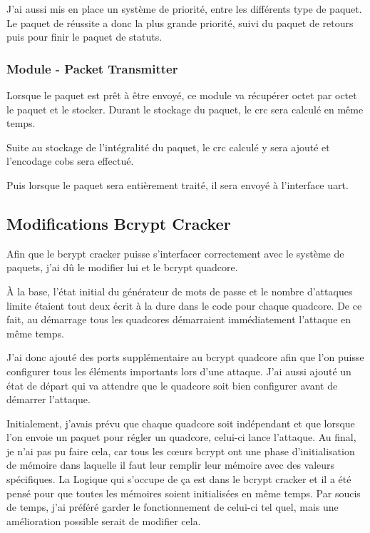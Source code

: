 J’ai aussi mis en place un système de priorité, entre les différents type de paquet. 
Le paquet de réussite a donc la plus grande priorité, suivi du paquet de retours puis pour finir le paquet de statuts.

\subsubsection{Module - Packet Transmitter}

Lorsque le paquet est prêt à être envoyé, ce module va récupérer octet par octet le paquet et le stocker.
Durant le stockage du paquet, le \gls{crc} sera calculé en même temps.

Suite au stockage de l'intégralité du paquet, le \gls{crc} calculé y sera ajouté et l'encodage \gls{cobs} sera effectué.

Puis lorsque le paquet sera entièrement traité, il sera envoyé à l'interface \gls{uart}.

\subsection{Modifications Bcrypt Cracker}

Afin que le bcrypt cracker puisse s'interfacer correctement avec le système de paquets, j'ai dû le modifier lui et le bcrypt quadcore.

À la base, l'état initial du générateur de mots de passe et le nombre d'attaques limite étaient tout deux écrit à la dure dans le code pour chaque quadcore.
De ce fait, au démarrage tous les quadcores démarraient immédiatement l'attaque en même temps.

J'ai donc ajouté des ports supplémentaire au bcrypt quadcore afin que l'on puisse configurer tous les éléments importants lors d'une attaque.
J'ai aussi ajouté un état de départ qui va attendre que le quadcore soit bien configurer avant de démarrer l'attaque.

Initialement, j'avais prévu que chaque quadcore soit indépendant et que lorsque l'on envoie un paquet pour régler un quadcore, celui-ci lance l'attaque.
Au final, je n'ai pas pu faire cela, car tous les cœurs bcrypt ont une phase d'initialisation de mémoire dans laquelle il faut leur remplir leur mémoire avec des valeurs spécifiques.
La Logique qui s'occupe de ça est dans le bcrypt cracker et il a été pensé pour que toutes les mémoires soient initialisées en même temps.
Par soucis de temps, j'ai préféré garder le fonctionnement de celui-ci tel quel, mais une amélioration possible serait de modifier cela. 

